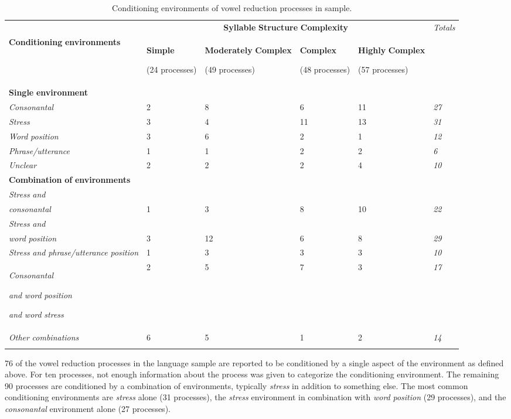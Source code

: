 \begin{table}
\begin{tabularx}{\textwidth}{XXXXXX}
\lsptoprule
 & \multicolumn{4}{c}{ \textbf{Syllable} \textbf{Structure} \textbf{Complexity}} & \textit{Totals}\\
 \textbf{Conditioning} \textbf{environments} & { \textbf{Simple}}

 (24 processes) & { \textbf{Moderately} \textbf{Complex}}

 (49 processes) & { \textbf{Complex}}

 (48 processes) & { \textbf{Highly} \textbf{Complex}}

 (57 processes) & \\
 \textbf{Single} \textbf{environment} & \multicolumn{5}{c}{}\\
 \textit{Consonantal} & 2 & 8 & 6 & 11 & \textit{27}\\
 \textit{Stress} & 3 & 4 & 11 & 13 & \textit{31}\\
 \textit{Word} \textit{position} & 3 & 6 & 2 & 1 & \textit{12}\\
 \textit{Phrase/utterance} & 1 & 1 & 2 & 2 & \textit{6}\\
 \textit{Unclear} & 2 & 2 & 2 & 4 & \textit{10}\\
 \textbf{Combination} \textbf{of} \textbf{environments} & \multicolumn{5}{c}{}\\
 \textit{Stress} \textit{and} \\
\textit{consonantal} & 1 & 3 & 8 & 10 & \textit{22}\\
 \textit{Stress} \textit{and} \\
\textit{word} \textit{position} & 3 & 12 & 6 & 8 & \textit{29}\\
 \textit{Stress} \textit{and} \textit{phrase/utterance} \textit{position} & 1 & 3 & 3 & 3 & \textit{10}\\
{ \textit{Consonantal} }

{ \textit{and} \textit{word} \textit{position} }

 \textit{and} \textit{word} \textit{stress} & 2 & 5 & 7 & 3 & \textit{17}\\
 \textit{Other} \textit{combinations} & 6 & 5 & 1 & 2 & \textit{14}\\
\lspbottomrule
\end{tabularx}
\caption{\label{6.6}Conditioning environments of vowel reduction processes in sample.}
\end{table}




  76 of the vowel reduction processes in the language sample are reported to be conditioned by a single aspect of the environment as defined above. For ten processes, not enough information about the process was given to categorize the conditioning environment. The remaining 90 processes are conditioned by a combination of environments, typically \textit{stress} in addition to something else. The most common conditioning environments are \textit{stress} alone (31 processes), the \textit{stress} environment in combination with \textit{word} \textit{position} (29 processes), and the \textit{consonantal} environment alone (27 processes).



